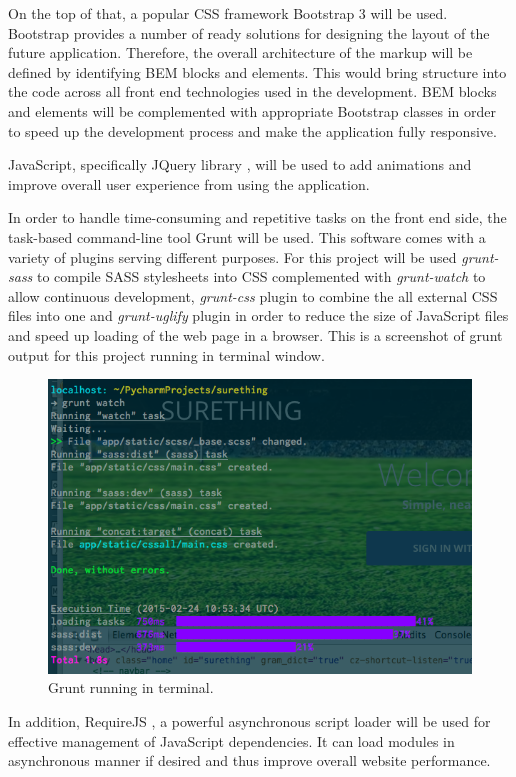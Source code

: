 On the top of that, a popular CSS framework Bootstrap 3 \cite{documentation:Bootstrap3} will be used. Bootstrap provides a number of ready solutions for designing the layout of the future application. Therefore, the overall architecture of the markup will be defined by identifying BEM blocks and elements. This would bring structure into the code across all front end technologies used in the development. BEM blocks and elements will be complemented with appropriate Bootstrap classes in order to speed up the development process and make the application fully responsive.
 
JavaScript, specifically JQuery library \cite{documentation:jQuery}, will be used to add animations and improve overall user experience from using the application.  

In order to handle time-consuming and repetitive tasks on the front end side, the task-based command-line tool Grunt will be used. This software comes with a variety of plugins serving different purposes. For this project will be used \emph{grunt-sass} to compile SASS stylesheets into CSS complemented with \emph{grunt-watch} to allow continuous development, \emph{grunt-css} plugin to combine the all external CSS files into one and \emph{grunt-uglify} plugin in order to reduce the size of JavaScript files and speed up loading of the web page in a browser. This is a screenshot of grunt output for this project running in terminal window.

\begin{figure}[H]
	\begin{center}
		\includegraphics[width=.60\linewidth,natwidth=610,natheight=540]{impl/images/gruntInAction}
		\caption{Grunt running in terminal.} \label{fig:using:gruntInAction}
	\end{center}
\end{figure}
	
In addition, RequireJS  \cite{documentation:RequireJS}, a powerful asynchronous script loader will be used for effective management of JavaScript dependencies. It can load modules in asynchronous manner if desired and thus improve overall website performance.

